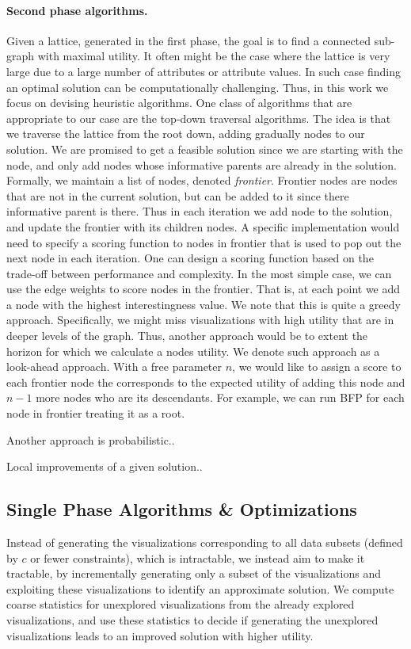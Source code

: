 \paragraph{Second phase algorithms.} Given a lattice, generated in the first phase, the goal is to find a connected sub-graph with maximal utility. It often might be the case where the lattice is very large due to a large number of attributes or attribute values. In such case finding an optimal solution can be computationally challenging. Thus, in this work we focus on devising heuristic algorithms. One class of algorithms that are appropriate to our case are the top-down traversal algorithms. The idea is that we traverse the lattice from the root down, adding gradually nodes to our solution. We are promised to get a feasible solution since we are starting with the node, and only add nodes whose informative parents are already in the solution. Formally, we maintain a list of nodes, denoted \textit{frontier}. Frontier nodes are nodes that are not in the current solution, but can be added to it since there informative parent is there. Thus in each iteration we add node to the solution, and update the frontier with its children nodes. A specific implementation would need to specify a scoring function to nodes in frontier that is used to pop out the next node in each iteration.
One can design a scoring function based on the trade-off between performance and complexity. In the most simple case, we can use the edge weights to score nodes in the frontier. That is, at each point we add a node with the highest interestingness value. We note that this is quite a greedy approach. Specifically, we might miss visualizations with high utility that are in deeper levels of the graph. Thus, another approach would be to extent the horizon for which we calculate a nodes utility. We denote such approach as a look-ahead approach. With a free parameter $n$, we would like to assign a score to each frontier node the corresponds to the expected utility of adding this node and $n-1$ more nodes who are its descendants. For example, we can run BFP for each node in frontier treating it as a root. 

Another approach is probabilistic..

Local improvements of a given solution..

\subsection{Single Phase Algorithms \& Optimizations}
Instead of generating the visualizations corresponding to all data subsets (defined by $c$ or fewer constraints), which is intractable, we instead aim to make it tractable, by incrementally generating only a subset of the visualizations and exploiting these visualizations to identify an approximate solution. We compute coarse statistics for unexplored visualizations from the already explored visualizations, and use these statistics to decide if generating the unexplored visualizations leads to an improved solution with higher utility.

